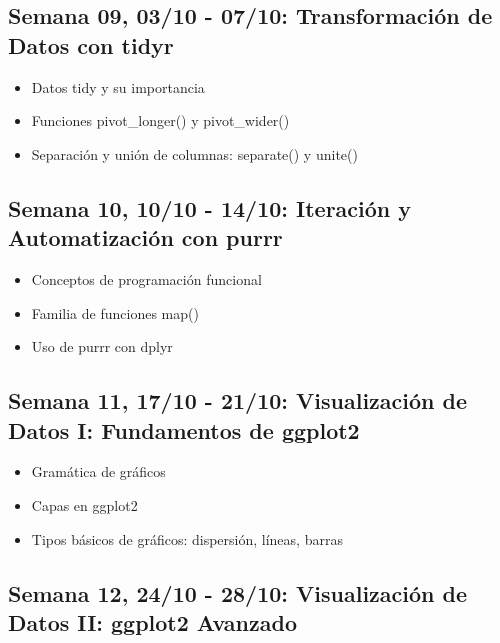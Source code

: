 \documentclass[11pt,letter,]{article}
\providecommand{\tightlist}{%
  \setlength{\itemsep}{0pt}\setlength{\parskip}{0pt}}
\begin{document}
\hypertarget{semana-09-0310---0710-transformaciuxf3n-de-datos-con-tidyr}{%
\subsection{Semana 09, 03/10 - 07/10: Transformación de Datos con
tidyr}\label{semana-09-0310---0710-transformaciuxf3n-de-datos-con-tidyr}}

\begin{itemize}
\tightlist
\item
  Datos tidy y su importancia
\item
  Funciones pivot\_longer() y pivot\_wider()
\item
  Separación y unión de columnas: separate() y unite()
\end{itemize}

\hypertarget{semana-10-1010---1410-iteraciuxf3n-y-automatizaciuxf3n-con-purrr}{%
\subsection{Semana 10, 10/10 - 14/10: Iteración y Automatización con
purrr}\label{semana-10-1010---1410-iteraciuxf3n-y-automatizaciuxf3n-con-purrr}}

\begin{itemize}
\tightlist
\item
  Conceptos de programación funcional
\item
  Familia de funciones map()
\item
  Uso de purrr con dplyr
\end{itemize}

\hypertarget{semana-11-1710---2110-visualizaciuxf3n-de-datos-i-fundamentos-de-ggplot2}{%
\subsection{Semana 11, 17/10 - 21/10: Visualización de Datos I:
Fundamentos de
ggplot2}\label{semana-11-1710---2110-visualizaciuxf3n-de-datos-i-fundamentos-de-ggplot2}}

\begin{itemize}
\tightlist
\item
  Gramática de gráficos
\item
  Capas en ggplot2
\item
  Tipos básicos de gráficos: dispersión, líneas, barras
\end{itemize}

\hypertarget{semana-12-2410---2810-visualizaciuxf3n-de-datos-ii-ggplot2-avanzado}{%
\subsection{Semana 12, 24/10 - 28/10: Visualización de Datos II: ggplot2
Avanzado}\label{semana-12-2410---2810-visualizaciuxf3n-de-datos-ii-ggplot2-avanzado}}
\end{document}
